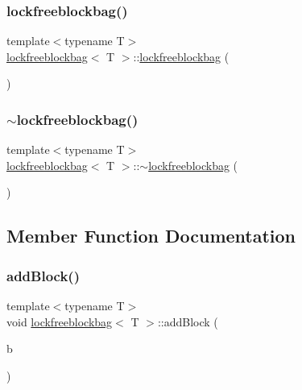 \subsubsection{\texorpdfstring{lockfreeblockbag()}{lockfreeblockbag()}}
{\footnotesize\ttfamily template$<$typename T$>$ \\
\hyperlink{classlockfreeblockbag}{lockfreeblockbag}$<$ T $>$\+::\hyperlink{classlockfreeblockbag}{lockfreeblockbag} (\begin{DoxyParamCaption}{ }\end{DoxyParamCaption})\hspace{0.3cm}{\ttfamily [inline]}}

\mbox{\label{classlockfreeblockbag_ab6f3bc34595acb7ac17072acf2ae7901}} 
\subsubsection{\texorpdfstring{$\sim$lockfreeblockbag()}{~lockfreeblockbag()}}
{\footnotesize\ttfamily template$<$typename T$>$ \\
\hyperlink{classlockfreeblockbag}{lockfreeblockbag}$<$ T $>$\+::$\sim$\hyperlink{classlockfreeblockbag}{lockfreeblockbag} (\begin{DoxyParamCaption}{ }\end{DoxyParamCaption})\hspace{0.3cm}{\ttfamily [inline]}}



\subsection{Member Function Documentation}
\mbox{\label{classlockfreeblockbag_a722c146f5d2b578426cc9c418f394486}} 
\subsubsection{\texorpdfstring{add\+Block()}{addBlock()}}
{\footnotesize\ttfamily template$<$typename T$>$ \\
void \hyperlink{classlockfreeblockbag}{lockfreeblockbag}$<$ T $>$\+::add\+Block (\begin{DoxyParamCaption}\item[{\hyperlink{classblock}{block}$<$ T $>$ $\ast$}]{b }\end{DoxyParamCaption})\hspace{0.3cm}{\ttfamily [inline]}}

